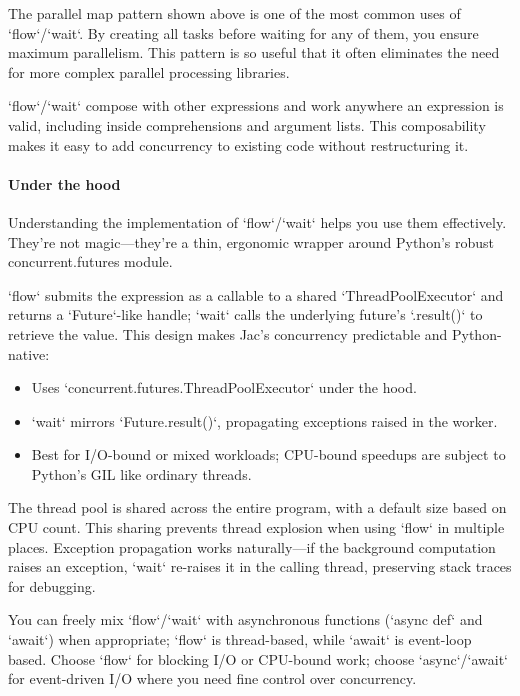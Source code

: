 The parallel map pattern shown above is one of the most common uses of `flow`/`wait`. By creating all tasks before waiting for any of them, you ensure maximum parallelism. This pattern is so useful that it often eliminates the need for more complex parallel processing libraries.

`flow`/`wait` compose with other expressions and work anywhere an expression is valid, including inside comprehensions and argument lists. This composability makes it easy to add concurrency to existing code without restructuring it.

\paragraph{Under the hood}

Understanding the implementation of `flow`/`wait` helps you use them effectively. They're not magic—they're a thin, ergonomic wrapper around Python's robust concurrent.futures module.

`flow` submits the expression as a callable to a shared `ThreadPoolExecutor` and returns a `Future`-like handle; `wait` calls the underlying future's `.result()` to retrieve the value. This design makes Jac's concurrency predictable and Python-native:

\begin{itemize}
    \item Uses `concurrent.futures.ThreadPoolExecutor` under the hood.
    \item `wait` mirrors `Future.result()`, propagating exceptions raised in the worker.
    \item Best for I/O-bound or mixed workloads; CPU-bound speedups are subject to Python's GIL like ordinary threads.
\end{itemize}

The thread pool is shared across the entire program, with a default size based on CPU count. This sharing prevents thread explosion when using `flow` in multiple places. Exception propagation works naturally—if the background computation raises an exception, `wait` re-raises it in the calling thread, preserving stack traces for debugging.

You can freely mix `flow`/`wait` with asynchronous functions (`async def` and `await`) when appropriate; `flow` is thread-based, while `await` is event-loop based. Choose `flow` for blocking I/O or CPU-bound work; choose `async`/`await` for event-driven I/O where you need fine control over concurrency.

